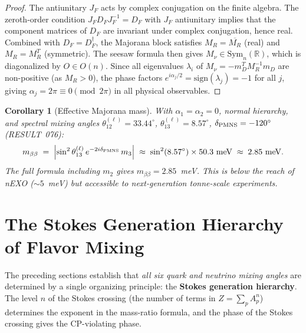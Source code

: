 \documentclass[12pt]{article}
\newtheorem{corollary}[theorem]{Corollary}
\theoremstyle{definition}
\theoremstyle{remark}
\begin{document}
\begin{proof}
The antiunitary $J_F$ acts by complex conjugation on the finite algebra.
The zeroth-order condition $J_F D_F J_F^{-1} = D_F$ with $J_F$ antiunitary implies
that the component matrices of $D_F$ are invariant under complex conjugation,
hence real.  Combined with $D_F = D_F^\dag$, the Majorana block satisfies
$M_R = \overline{M_R}$ (real) and $M_R = M_R^T$ (symmetric).
The seesaw formula then gives $M_\nu \in \mathrm{Sym}_n(\mathbb{R})$, which is
diagonalized by $O \in O(n)$.  Since all eigenvalues $\lambda_i$ of
$M_\nu = -m_D^T M_R^{-1} m_D$ are non-positive (as $M_R > 0$), the phase factors
$e^{i\alpha_j/2} = \mathrm{sign}(\lambda_j) = -1$ for all $j$, giving
$\alpha_j = 2\pi \equiv 0 \pmod{2\pi}$ in all physical observables.
\end{proof}

\begin{corollary}[Effective Majorana mass]
\label{cor:mbb}
With $\alpha_1 = \alpha_2 = 0$, normal hierarchy, and spectral mixing angles
$\theta_{12}^{(\ell)}=33.44^\circ$, $\theta_{13}^{(\ell)}=8.57^\circ$,
$\delta_{\rm PMNS}=-120^\circ$ (RESULT~076):
\[
  m_{\beta\beta}
  \;=\;
  \Bigl|\sin^2\theta_{13}^{(\ell)}\,e^{-2i\delta_{\rm PMNS}}\,m_3\Bigr|
  \;\approx\;
  \sin^2(8.57^\circ)\times 50.3\ \mathrm{meV}
  \;\approx\; 2.85\ \mathrm{meV}.
\]
The full formula including $m_2$ gives $m_{\beta\beta} = 2.85$~meV.
This is below the reach of nEXO ($\sim 5$~meV) but accessible to
next-generation tonne-scale experiments.
\end{corollary}

\section{The Stokes Generation Hierarchy of Flavor Mixing}
\label{sec:stokes_hierarchy}

The preceding sections establish that \emph{all six quark and neutrino
mixing angles} are determined by a single organizing principle:
the \textbf{Stokes generation hierarchy}.  The level $n$ of the Stokes
crossing (the number of terms in $Z = \sum_p A_p^n$) determines the
exponent in the mass-ratio formula, and the phase of the Stokes crossing
gives the CP-violating phase.
\end{document}
